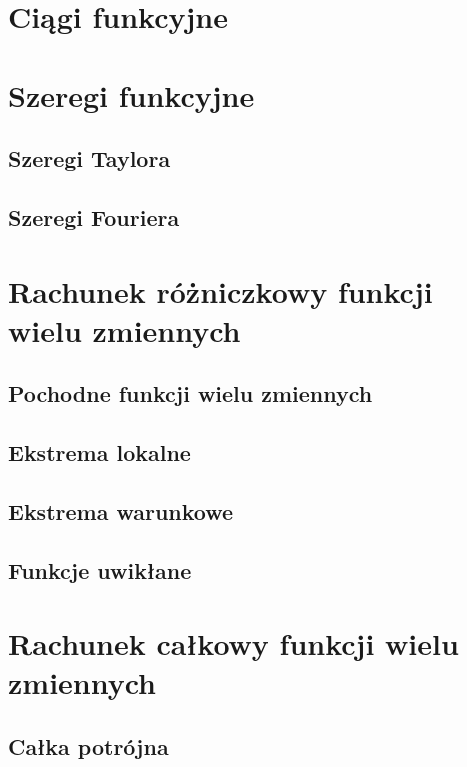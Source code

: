 \documentclass[11pt]{scrartcl}
\begin{document}
    \section{Ciągi funkcyjne}
    

    \section{Szeregi funkcyjne}
    
        \subsection{Szeregi Taylora}
        
        \subsection{Szeregi Fouriera}
        

    \section{Rachunek różniczkowy funkcji wielu zmiennych}
    
        \subsection{Pochodne funkcji wielu zmiennych}
        
        \subsection{Ekstrema lokalne}
        
        \subsection{Ekstrema warunkowe}
        
        \subsection{Funkcje uwikłane}
        

    \section{Rachunek całkowy funkcji wielu zmiennych}
    
        \subsection{Całka potrójna}
        
\end{document}
